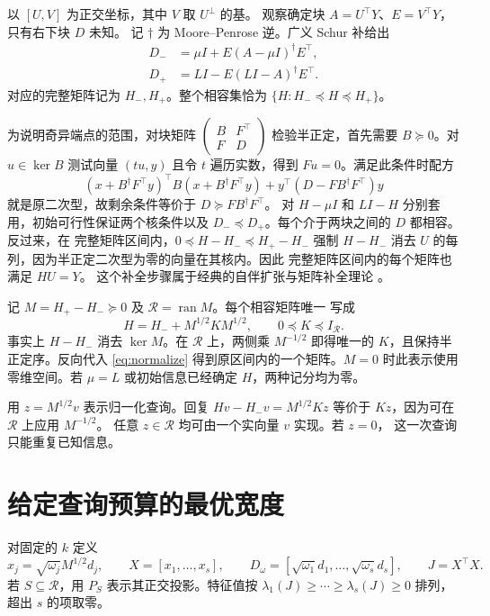 \documentclass[UTF8,11pt,fontset=windows]{ctexart}
\newcommand{\ran}{\operatorname{ran}}
\begin{document}
以 \([U,V]\) 为正交坐标，其中 \(V\) 取 \(U^\perp\) 的基。
观察确定块 \(A=U^\top Y\)、\(E=V^\top Y\)，只有右下块 \(D\) 未知。
记 \(\dagger\) 为 Moore--Penrose 逆。广义 Schur 补给出
\begin{align}
 D_- &= \mu I+E(A-\mu I)^\dagger E^\top,\\
 D_+ &= LI-E(LI-A)^\dagger E^\top.
\end{align}
对应的完整矩阵记为 \(H_-,H_+\)。整个相容集恰为
\(\{H:H_-\preceq H\preceq H_+\}\)。

为说明奇异端点的范围，对块矩阵
\(\left(\begin{smallmatrix}B&F^\top\\ F&D\end{smallmatrix}\right)\)
检验半正定，首先需要 \(B\succeq0\)。对 \(u\in\ker B\) 测试向量
\((t u,y)\) 且令 \(t\) 遍历实数，得到 \(Fu=0\)。满足此条件时配方
\[
 (x+B^\dagger F^\top y)^\top B(x+B^\dagger F^\top y)
     +y^\top(D-FB^\dagger F^\top)y
\]
就是原二次型，故剩余条件等价于 \(D\succeq FB^\dagger F^\top\)。
对 \(H-\mu I\) 和 \(LI-H\) 分别套用，初始可行性保证两个核条件以及
\(D_-\preceq D_+\)。每个介于两块之间的 \(D\) 都相容。反过来，在
完整矩阵区间内，\(0\preceq H-H_-\preceq H_+-H_-\) 强制 \(H-H_-\)
消去 \(U\) 的每列，因为半正定二次型为零的向量在其核内。因此
完整矩阵区间内的每个矩阵也满足 \(HU=Y\)。
这个补全步骤属于经典的自伴扩张与矩阵补全理论
\cite{DavisKahanWeinberger,ArlinskiiHassiDeSnoo}。

记 \(M=H_+-H_-\succeq0\) 及 \(\mathcal R=\ran M\)。每个相容矩阵唯一
写成
\begin{equation}
 H=H_-+M^{1/2}K M^{1/2},\qquad 0\preceq K\preceq I_{\mathcal R}.
 \label{eq:normalize}
\end{equation}
事实上 \(H-H_-\) 消去 \(\ker M\)。在 \(\mathcal R\) 上，两侧乘
\(M^{-1/2}\) 即得唯一的 \(K\)，且保持半正定序。反向代入
\eqref{eq:normalize} 得到原区间内的一个矩阵。\(M=0\) 时此表示使用
零维空间。若 \(\mu=L\) 或初始信息已经确定 \(H\)，两种记分均为零。

用 \(z=M^{1/2}v\) 表示归一化查询。回复 \(Hv-H_-v=M^{1/2}Kz\)
等价于 \(Kz\)，因为可在 \(\mathcal R\) 上应用 \(M^{-1/2}\)。
任意 \(z\in\mathcal R\) 均可由一个实向量 \(v\) 实现。若 \(z=0\)，
这一次查询只能重复已知信息。

\section{给定查询预算的最优宽度}

对固定的 \(k\) 定义
\[
 x_j=\sqrt{\omega_j} M^{1/2}d_j,\qquad
 X=[x_1,\ldots,x_s],\qquad
 D_\omega=[\sqrt{\omega_1}d_1,\ldots,\sqrt{\omega_s}d_s],\qquad
 J=X^\top X.
\]
若 \(S\subseteq\mathcal R\)，用 \(P_S\) 表示其正交投影。特征值按
\(\lambda_1(J)\ge\cdots\ge\lambda_s(J)\ge0\) 排列，超出 \(s\) 的项取零。
\end{document}
